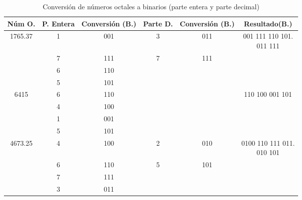 \documentclass[12pt]{article}
\begin{document}
\begin{table}[H]
	\centering
	\renewcommand{\arraystretch}{1.3}
	\begin{tabular}{|c|c|c|c|c|c|}
		\hline
		\textbf{Núm O.} & \textbf{P. Entera} & \textbf{Conversión (B.)} & \textbf{Parte D.} & \textbf{Conversión (B.)} & \textbf{Resultado(B.)} \\
		\hline
		1765.37 & 1 & 001 & 3 & 011 & \makecell[l]{001 111 110 101.\\011 111} \\
		\hline
		& 7 & 111 & 7 & 111 & \\
		\hline
		& 6 & 110 &  &  & \\
		\hline
		& 5 & 101 &  &  & \\
		\hline
		6415 & 6 & 110 &  &  & 110 100 001 101 \\
		\hline
		& 4 & 100 &  &  & \\
		\hline
		& 1 & 001 &  &  & \\
		\hline
		& 5 & 101 &  &  & \\
		\hline
		4673.25 & 4 & 100 & 2 & 010 & \makecell[l]{0100 110 111 011.\\010 101} \\
		\hline
		& 6 & 110 & 5 & 101 & \\
		\hline
		& 7 & 111 &  &  & \\
		\hline
		& 3 & 011 &  &  & \\
		\hline
	\end{tabular}
	\caption{Conversión de números octales a binarios (parte entera y parte decimal)}
\end{table}
\end{document}
